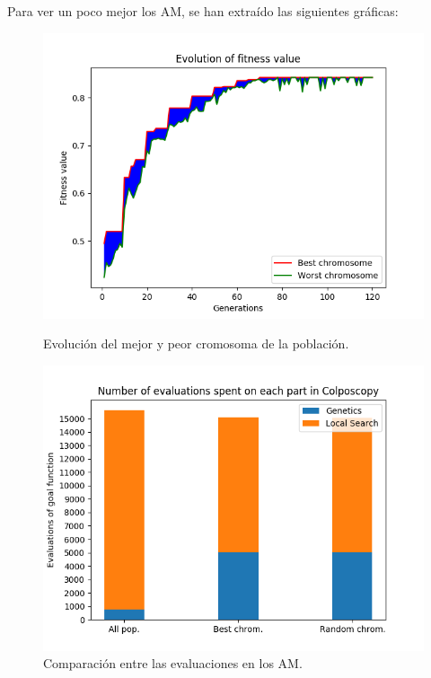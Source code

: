 \documentclass[11pt,a4paper]{article}
\begin{document}
Para ver un poco mejor los AM, se han extraído las siguientes gráficas:

\begin{figure}[H]
\centering
\begin{minipage}{.5\textwidth}
	\centering
	\includegraphics[scale=0.43]{img/am-all-colposcopy.png}
	\caption{Evolución del mejor y peor cromosoma de la población.}
\end{minipage}%
\begin{minipage}{.5\textwidth}
	\centering
	\includegraphics[scale=0.43]{img/bars-colposcopy.png}
	\caption{Comparación entre las evaluaciones en los AM.}
\end{minipage}
\end{figure}
\end{document}

